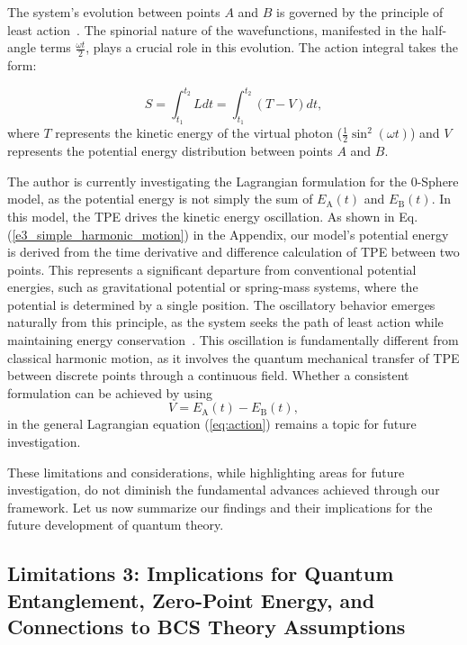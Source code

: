 \documentclass[%
 reprint,
 amsmath,amssymb,
 aps,
]{revtex4-1}
\numberwithin{equation}{section}%
\begin{document}
The system's evolution between points $A$ and $B$ is governed by the principle of least action~\cite{misner1973}. The spinorial nature of the wavefunctions, manifested in the half-angle terms $\frac{\omega t}{2}$, plays a crucial role in this evolution. The action integral takes the form:

\begin{equation}
    S = \int_{t_1}^{t_2} L dt = \int_{t_1}^{t_2} (T - V) dt,
    \label{eq:action}
\end{equation}
where $T$ represents the kinetic energy of the virtual photon ($\frac{1}{2}\sin^2(\omega t)$) and $V$ represents the potential energy distribution between points $A$ and $B$.

The author is currently investigating the Lagrangian formulation for the 0-Sphere model, as the potential energy is not simply the sum of $E_{\mathrm{A}}(t)$ and $E_{\mathrm{B}}(t)$. In this model, the TPE drives the kinetic energy oscillation. As shown in Eq. (\ref{e3_simple_harmonic_motion}) in the Appendix, our model's potential energy is derived from the time derivative and difference calculation of TPE between two points. This represents a significant departure from conventional potential energies, such as gravitational potential or spring-mass systems, where the potential is determined by a single position. The oscillatory behavior emerges naturally from this principle, as the system seeks the path of least action while maintaining energy conservation~\cite{shapere1989}. This oscillation is fundamentally different from classical harmonic motion, as it involves the quantum mechanical transfer of TPE between discrete points through a continuous field.
 Whether a consistent formulation can be achieved by using
\begin{equation}
    V = E_{\mathrm{A}}(t) - E_{\mathrm{B}}(t),
\end{equation}
\noindent in the general Lagrangian equation (\ref{eq:action}) remains a topic for future investigation. 

These limitations and considerations, while highlighting areas for future investigation, do not diminish the fundamental advances achieved through our framework. Let us now summarize our findings and their implications for the future development of quantum theory.


\subsection{\label{sec:Limitation 3}Limitations 3:
Implications for Quantum Entanglement, Zero-Point Energy, and Connections to BCS Theory Assumptions}
\end{document}
